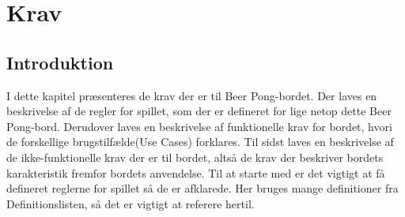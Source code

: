 \documentclass[Rapport/Rapport_main.tex]{subfiles}
\begin{document}
\section{Krav}
\subsection{Introduktion}
I dette kapitel præsenteres de krav der er til Beer Pong-bordet. Der laves en beskrivelse af de regler for spillet, som der er defineret for lige netop dette Beer Pong-bord. Derudover laves en beskrivelse af funktionelle krav for bordet, hvori de forskellige brugstilfælde(Use Cases) forklares. Til sidst laves en beskrivelse af de ikke-funktionelle krav der er til bordet, altså de krav der beskriver bordets karakteristik fremfor bordets anvendelse. Til at starte med er det vigtigt at få defineret reglerne for spillet så de er afklarede. Her bruges mange definitioner fra Definitionslisten, så det er vigtigt at referere hertil.
\end{document}
